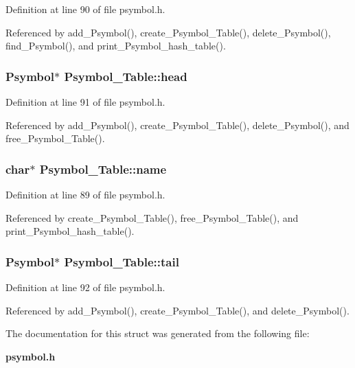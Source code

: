 Definition at line 90 of file psymbol.h.

Referenced by add\_\-Psymbol(), create\_\-Psymbol\_\-Table(), delete\_\-Psymbol(), find\_\-Psymbol(), and print\_\-Psymbol\_\-hash\_\-table().
\subsubsection{\setlength{\rightskip}{0pt plus 5cm}\bf{Psymbol}$\ast$ \bf{Psymbol\_\-Table::head}}\label{structPsymbol__Table_9444054db2884af67c064f1eefbe6bb4}




Definition at line 91 of file psymbol.h.

Referenced by add\_\-Psymbol(), create\_\-Psymbol\_\-Table(), delete\_\-Psymbol(), and free\_\-Psymbol\_\-Table().
\subsubsection{\setlength{\rightskip}{0pt plus 5cm}char$\ast$ \bf{Psymbol\_\-Table::name}}\label{structPsymbol__Table_57d15d110eac8af9030b032bbc6d90e9}




Definition at line 89 of file psymbol.h.

Referenced by create\_\-Psymbol\_\-Table(), free\_\-Psymbol\_\-Table(), and print\_\-Psymbol\_\-hash\_\-table().
\subsubsection{\setlength{\rightskip}{0pt plus 5cm}\bf{Psymbol}$\ast$ \bf{Psymbol\_\-Table::tail}}\label{structPsymbol__Table_9e9cc5825e600e614df0fa3626de4d6d}




Definition at line 92 of file psymbol.h.

Referenced by add\_\-Psymbol(), create\_\-Psymbol\_\-Table(), and delete\_\-Psymbol().

The documentation for this struct was generated from the following file:\begin{CompactItemize}
\item 
\bf{psymbol.h}\end{CompactItemize}
